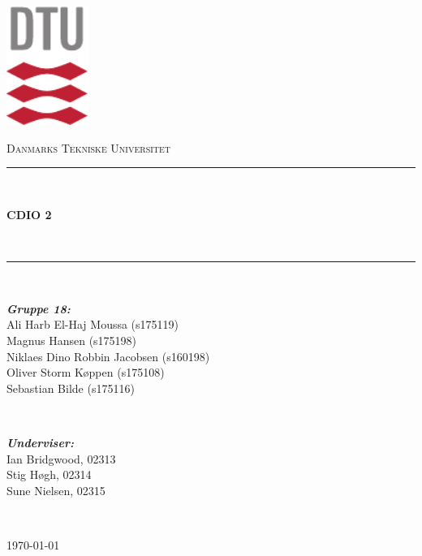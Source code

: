\begin{titlepage}
	\centering
	\includegraphics[width=0.2\textwidth]{graphics/dtu/DTU-logo-CMYK}\par\vspace{1cm}
	{\scshape\LARGE Danmarks Tekniske Universitet \par}
	\vspace{3.5cm}
	\rule{\linewidth}{0.2 mm} \\[0.4 cm]
	{\huge\bfseries CDIO 2 \par} \
	\rule{\linewidth}{0.2 mm} \\[1.5 cm]
	\vspace{1cm}
	
	\begin{minipage}{0.5\textwidth}
		\begin{flushleft}
			\small
			\emph{\textbf{Gruppe 18:}}\\
			Ali Harb El-Haj Moussa (s175119) \\
			Magnus Hansen (s175198) \\
			Niklaes Dino Robbin Jacobsen (s160198) \\
			Oliver Storm Køppen (s175108) \\
			Sebastian Bilde (s175116)
		\end{flushleft}
	\end{minipage}
	~
	\begin{minipage}{0.4\textwidth}
		\begin{flushright}
			\small
			\emph{\textbf{Underviser:}} \\
			Ian Bridgwood, 02313 \\
			Stig Høgh, 02314 \\
			Sune Nielsen, 02315
		\end{flushright}
	\end{minipage}\\[4cm]
	
	\vfill
	{\large \today\par}
\end{titlepage}

\pagebreak

